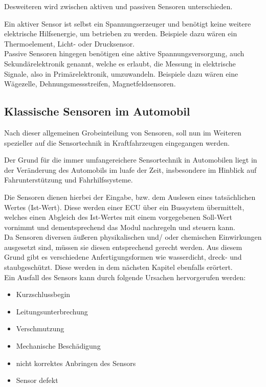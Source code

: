                 
                Desweiteren wird zwischen aktiven und passiven Sensoren unterschieden. 
                
                Ein aktiver Sensor ist selbst ein Spannungserzeuger und benötigt keine weitere elektrische Hilfsenergie, um betrieben zu werden. Beispiele dazu wären ein Thermoelement, Licht- oder Drucksensor.\\
                
                Passive Sensoren hingegen benötigen eine aktive Spannungsversorgung, auch Sekundärelektronik genannt, welche es erlaubt, die Messung in elektrische Signale, also in Primärelektronik, umzuwandeln. Beispiele dazu wären eine Wägezelle, Dehnungsmessstreifen, Magnetfeldsensoren.		
                            
                                        
\subsection{Klassische Sensoren im Automobil} 
        
    Nach dieser allgemeinen Grobeinteilung von Sensoren, soll nun im Weiteren spezieller auf die Sensortechnik in Kraftfahrzeugen eingegangen werden.

    Der Grund für die immer umfangereichere Sensortechnik in Automobilen liegt in der Veränderung des Automobils im luafe der Zeit, insbesondere im Hinblick auf Fahrunterstützung und Fahrhilfssysteme.
    
    Die Sensoren dienen hierbei der Eingabe,  bzw. dem Auslesen eines tatsächlichen Wertes (Ist-Wert). Diese werden einer ECU über ein Bussystem übermittelt, welches einen Abgleich des Ist-Wertes mit einem vorgegebenen Soll-Wert vornimmt und dementsprechend das Modul nachregeln und steuern kann. \\ 
    
    Da Sensoren diversen äußeren physikalischen und/ oder chemischen Einwirkungen ausgesetzt sind, müssen sie diesen entsprechend gerecht werden. Aus diesem Grund gibt es verschiedene Anfertigungsformen wie wasserdicht, dreck- und staubgeschützt. Diese werden in dem nächsten Kapitel ebenfalls erörtert.\\  
            
        Ein Ausfall des Sensors kann durch folgende Ursachen hervorgerufen werden:

        \begin{itemize}
            \item Kurzschlussbegin
            \item Leitungsunterbrechung
            \item Verschmutzung
            \item Mechanische Beschädigung
            \item nicht korrektes Anbringen des Sensors
            \item Sensor defekt
        \end{itemize}	
        
